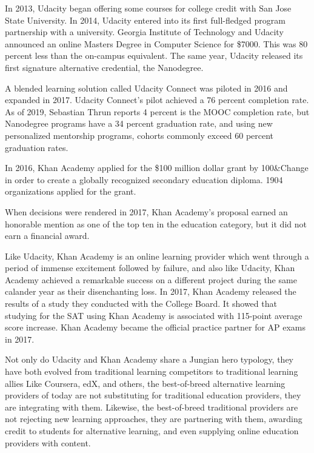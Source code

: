\documentclass[review]{elsarticle}
\begin{document}
    In 2013, Udacity began offering some courses for college credit with San Jose State University\cite{shen_2015}.
    In 2014, Udacity entered into its first full-fledged program partnership with a university.
    Georgia Institute of Technology and Udacity announced an online Masters Degree in Computer Science for \$7000.
    This was 80 percent less than the on-campus equivalent\cite{onink2013georgia}.
    The same year, Udacity released its first signature alternative credential, the Nanodegree.

    A blended learning solution called Udacity Connect was piloted in 2016 and expanded in 2017.
    Udacity Connect's pilot achieved a 76 percent completion rate\cite{shah_2018}.
    As of 2019, Sebastian Thrun reports 4 percent is the MOOC completion rate,
    but Nanodegree programs have a 34 percent graduation rate, and using new personalized mentorship programs, cohorts commonly exceed 60 percent graduation rates.

    In 2016, Khan Academy applied for the \$100 million dollar grant
    by 100\&Change in order to create a globally recognized secondary education diploma.
    1904 organizations applied for the grant\cite{conrad_2016}.

    
    When decisions were rendered in 2017, Khan Academy's proposal earned an honorable mention as one of the top ten in the education category,
    but it did not earn a financial award\cite{cushing_2017}.

    Like Udacity, Khan Academy is an online learning provider which went through a period of immense excitement followed by failure,
    and also like Udacity, Khan Academy achieved a remarkable success on a different project during the same calander year as their disenchanting loss.
    In 2017, Khan Academy released the results of a study they conducted with the College Board.
    It showed that studying for the SAT using Khan Academy is associated with 115-point average score increase\cite{khan_academy_sat_2017}.
    Khan Academy became the official practice partner for AP exams in 2017\cite{khan_academy_partner_2017}.

    Not only do Udacity and Khan Academy share a Jungian hero typology,
    they have both evolved from traditional learning competitors to traditional learning allies
    Like Coursera, edX, and others, the best-of-breed alternative learning providers of today are not substituting for traditional education providers,
    they are integrating with them. Likewise, the best-of-breed traditional providers are not rejecting new learning approaches,
    they are partnering with them, awarding credit to students for alternative learning, and even supplying online education providers with content.
\end{document}
